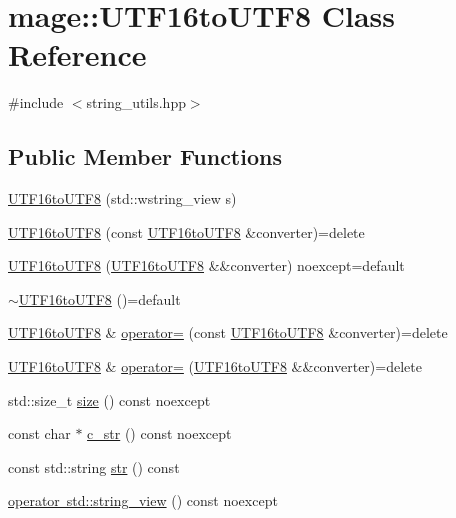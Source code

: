 \hypertarget{classmage_1_1_u_t_f16to_u_t_f8}{}\section{mage\+:\+:U\+T\+F16to\+U\+T\+F8 Class Reference}
\label{classmage_1_1_u_t_f16to_u_t_f8}


{\ttfamily \#include $<$string\+\_\+utils.\+hpp$>$}

\subsection*{Public Member Functions}
\begin{DoxyCompactItemize}
\item 
\mbox{\hyperlink{classmage_1_1_u_t_f16to_u_t_f8_acdf4f119c0754032fe913c2673a97c17}{U\+T\+F16to\+U\+T\+F8}} (std\+::wstring\+\_\+view s)
\item 
\mbox{\hyperlink{classmage_1_1_u_t_f16to_u_t_f8_ae26eb9ec3ee4b82dce91ea8673ed5c11}{U\+T\+F16to\+U\+T\+F8}} (const \mbox{\hyperlink{classmage_1_1_u_t_f16to_u_t_f8}{U\+T\+F16to\+U\+T\+F8}} \&converter)=delete
\item 
\mbox{\hyperlink{classmage_1_1_u_t_f16to_u_t_f8_a83ad160fb8621ea8688bd682f687a886}{U\+T\+F16to\+U\+T\+F8}} (\mbox{\hyperlink{classmage_1_1_u_t_f16to_u_t_f8}{U\+T\+F16to\+U\+T\+F8}} \&\&converter) noexcept=default
\item 
\mbox{\hyperlink{classmage_1_1_u_t_f16to_u_t_f8_ab65136ee98bee255c9c5eb0f230d1f03}{$\sim$\+U\+T\+F16to\+U\+T\+F8}} ()=default
\item 
\mbox{\hyperlink{classmage_1_1_u_t_f16to_u_t_f8}{U\+T\+F16to\+U\+T\+F8}} \& \mbox{\hyperlink{classmage_1_1_u_t_f16to_u_t_f8_a584632b0d7a6980846a437d162eb7a84}{operator=}} (const \mbox{\hyperlink{classmage_1_1_u_t_f16to_u_t_f8}{U\+T\+F16to\+U\+T\+F8}} \&converter)=delete
\item 
\mbox{\hyperlink{classmage_1_1_u_t_f16to_u_t_f8}{U\+T\+F16to\+U\+T\+F8}} \& \mbox{\hyperlink{classmage_1_1_u_t_f16to_u_t_f8_ae185d7a23683a59e573ae1ba1e9aa63b}{operator=}} (\mbox{\hyperlink{classmage_1_1_u_t_f16to_u_t_f8}{U\+T\+F16to\+U\+T\+F8}} \&\&converter)=delete
\item 
std\+::size\+\_\+t \mbox{\hyperlink{classmage_1_1_u_t_f16to_u_t_f8_a3ca7429982db2a8acf5b9dcfae4a1a12}{size}} () const noexcept
\item 
const char $\ast$ \mbox{\hyperlink{classmage_1_1_u_t_f16to_u_t_f8_a82f65e043a971c60c3f5c86f23e1c0ac}{c\+\_\+str}} () const noexcept
\item 
const std\+::string \mbox{\hyperlink{classmage_1_1_u_t_f16to_u_t_f8_a907c9aac369d7c9f66917aa53a5dd4b9}{str}} () const
\item 
\mbox{\hyperlink{classmage_1_1_u_t_f16to_u_t_f8_af78ff6e81b416d7da6a016bfcc5f4d9d}{operator std\+::string\+\_\+view}} () const noexcept
\end{DoxyCompactItemize}
